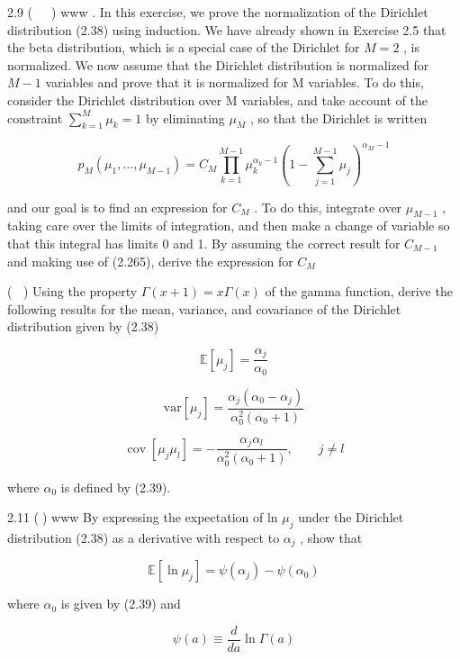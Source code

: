 \documentclass[
  10
]{article}
\begin{document}
2.9 (  ) www . In this exercise, we prove the normalization of the
Dirichlet distribution (2.38) using induction. We have already shown in
Exercise 2.5 that the beta distribution, which is a special case of the
Dirichlet for \(M = 2\) , is normalized. We now assume that the
Dirichlet distribution is normalized for \(M - 1\) variables and prove
that it is normalized for M variables. To do this, consider the
Dirichlet distribution over M variables, and take account of the
constraint \(\textstyle \sum _ { k = 1 } ^ { M } \mu _ { k } = 1\) by
eliminating \(\mu _ { M }\) , so that the Dirichlet is written

\[
p _ {M} (\mu_ {1}, \dots , \mu_ {M - 1}) = C _ {M} \prod_ {k = 1} ^ {M - 1} \mu_ {k} ^ {\alpha_ {k} - 1} \left(1 - \sum_ {j = 1} ^ {M - 1} \mu_ {j}\right) ^ {\alpha_ {M} - 1}\tag{2.272}
\]

and our goal is to find an expression for \(C _ { M }\) . To do this,
integrate over \(\mu _ { M - 1 }\) , taking care over the limits of
integration, and then make a change of variable so that this integral
has limits 0 and 1. By assuming the correct result for \(C _ { M - 1 }\)
and making use of (2.265), derive the expression for \(C _ { M }\)

( ) Using the property \(\Gamma ( x + 1 ) = x \Gamma ( x )\) of the
gamma function, derive the following results for the mean, variance, and
covariance of the Dirichlet distribution given by (2.38)

\[
\mathbb {E} [ \mu_ {j} ] = \frac {\alpha_ {j}}{\alpha_ {0}}\tag{2.273}
\]

\[
\mathrm{var} [ \mu_ {j} ] = \frac {\alpha_ {j} (\alpha_ {0} - \alpha_ {j})}{\alpha_ {0} ^ {2} (\alpha_ {0} + 1)}\tag{2.274}
\]

\[
\operatorname{cov} [ \mu_ {j} \mu_ {l} ] = - \frac {\alpha_ {j} \alpha_ {l}}{\alpha_ {0} ^ {2} (\alpha_ {0} + 1)}, \qquad j \neq l\tag{2.275}
\]

where \(\alpha _ { 0 }\) is defined by (2.39).

2.11 () www By expressing the expectation of ln \(\mu _ { j }\) under
the Dirichlet distribution (2.38) as a derivative with respect to
\(\alpha _ { j }\) , show that

\[
\mathbb {E} [ \ln \mu_ {j} ] = \psi (\alpha_ {j}) - \psi (\alpha_ {0})\tag{2.276}
\]

where \(\alpha _ { 0 }\) is given by (2.39) and

\[
\psi (a) \equiv \frac {d}{d a} \ln \Gamma (a)\tag{2.277}
\]
\end{document}

